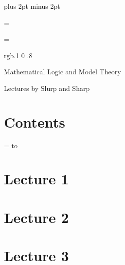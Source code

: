 

\parindent=0pt
\parskip=3pt plus 2pt minus 2pt



\footline={}


\headline={}

\color rgb{.1 0 .8}

{\def\boxshadowcolor{rgb{.3 .3 .8}}

    \centerline{Mathematical Logic and Model Theory}
    \smallskip
    \centerline{Lectures by Slurp and Sharp}

\eppbox

\bigskip

    \section*{Contents}
    
    \tableofcontents
\eppbox

}

\vfill\break

\color{black}

\newif\ifpageodd
\pageoddtrue
\headline={%
    \hbox to \hsize{\color{black}%
        \ifpageodd\hfil{\it\currsubsection\quad\bf\folio}\global\pageoddfalse%
        \else{\bf\folio\quad\it\currsubsection}\hfil\global\pageoddtrue\fi%
    }%
}


\section{Lecture 1}



\vfill\break

\section{Lecture 2}



\vfill\break

\section{Lecture 3}



\vfill\break

%
%

\bye

